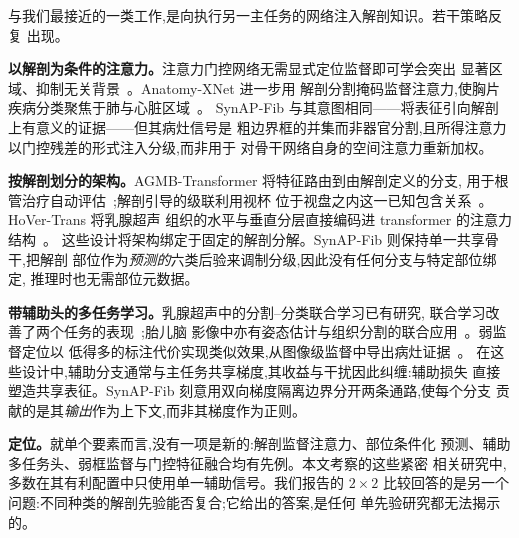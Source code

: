 与我们最接近的一类工作,是向执行另一主任务的网络注入解剖知识。若干策略反复
出现。

\textbf{以解剖为条件的注意力。}注意力门控网络无需显式定位监督即可学会突出
显著区域、抑制无关背景~\cite{attentiongated2019}。Anatomy-XNet 进一步用
解剖分割掩码监督注意力,使胸片疾病分类聚焦于肺与心脏区域~\cite{anatomyxnet2022}。
SynAP-Fib 与其意图相同——将表征引向解剖上有意义的证据——但其病灶信号是
粗边界框的并集而非器官分割,且所得注意力以门控残差的形式注入分级,而非用于
对骨干网络自身的空间注意力重新加权。

\textbf{按解剖划分的架构。}AGMB-Transformer 将特征路由到由解剖定义的分支,
用于根管治疗自动评估~\cite{agmbtransformer2021};解剖引导的级联利用视杯
位于视盘之内这一已知包含关系~\cite{opticdisc2020}。HoVer-Trans 将乳腺超声
组织的水平与垂直分层直接编码进 transformer 的注意力结构~\cite{hovertrans2023}。
这些设计将架构绑定于固定的解剖分解。SynAP-Fib 则保持单一共享骨干,把解剖
部位作为\emph{预测的}六类后验来调制分级,因此没有任何分支与特定部位绑定,
推理时也无需部位元数据。

\textbf{带辅助头的多任务学习。}乳腺超声中的分割--分类联合学习已有研究,
联合学习改善了两个任务的表现~\cite{zhou2020mtlabus,shamtl2021};胎儿脑
影像中亦有姿态估计与组织分割的联合应用~\cite{petsnet2023}。弱监督定位以
低得多的标注代价实现类似效果,从图像级监督中导出病灶证据~\cite{covidweak2020,weakbreast3d2019}。
在这些设计中,辅助分支通常与主任务共享梯度,其收益与干扰因此纠缠:辅助损失
直接塑造共享表征。SynAP-Fib 刻意用双向梯度隔离边界分开两条通路,使每个分支
贡献的是其\emph{输出}作为上下文,而非其梯度作为正则。

\textbf{定位。}就单个要素而言,没有一项是新的:解剖监督注意力、部位条件化
预测、辅助多任务头、弱框监督与门控特征融合均有先例。本文考察的这些紧密
相关研究中,多数在其有利配置中只使用单一辅助信号。我们报告的 $2\times2$
比较回答的是另一个问题:不同种类的解剖先验能否复合;它给出的答案,是任何
单先验研究都无法揭示的。
